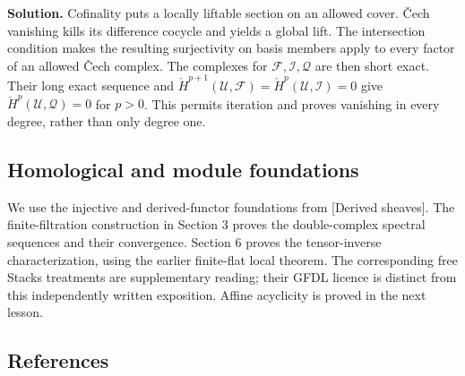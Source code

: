 \documentclass[11pt]{article}
\begin{document}
\textbf{Solution.} Cofinality puts a locally liftable section on an
allowed cover. Čech vanishing kills its difference cocycle and yields a
global lift. The intersection condition makes the resulting surjectivity
on basis members apply to every factor of an allowed Čech complex. The
complexes for \(\mathcal F,\mathcal I,\mathcal Q\) are then short exact.
Their long exact sequence and
\(\check H^{p+1}(\mathcal U,\mathcal F)=\check H^p(\mathcal U,\mathcal I)=0\)
give \(\check H^p(\mathcal U,\mathcal Q)=0\) for \(p>0\). This permits
iteration and proves vanishing in every degree, rather than only degree
one.

\subsection{Homological and module
foundations}\label{homological-and-module-foundations}

We use the injective and derived-functor foundations from {[}Derived
sheaves{]}. The finite-filtration construction in Section 3 proves the
double-complex spectral sequences and their convergence. Section 6
proves the tensor-inverse characterization, using the earlier
finite-flat local theorem. The corresponding free Stacks treatments are
supplementary reading; their GFDL licence is distinct from this
independently written exposition. Affine acyclicity is proved in the
next lesson.

\subsection{References}\label{references}
\end{document}
